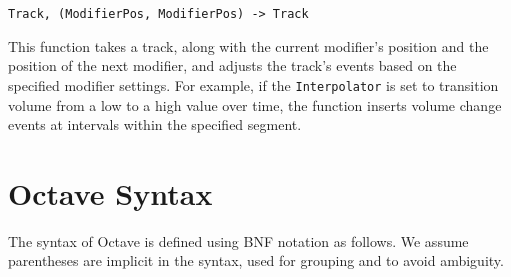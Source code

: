 \documentclass[letterpaper,12pt]{article}
\begin{document}
\begin{center}
\texttt{Track, (ModifierPos, ModifierPos) -> Track}
\end{center}

This function takes a track, along with the current modifier's position and the position of the next modifier, 
and adjusts the track's events based on the specified modifier settings. For example, if the \texttt{Interpolator} 
is set to transition volume from a low to a high value over time, the function inserts volume change events at 
intervals within the specified segment. 


\section{Octave Syntax}

The syntax of Octave is defined using BNF notation as follows. We assume parentheses are implicit in the syntax, used for grouping and to avoid ambiguity.

\end{document}
